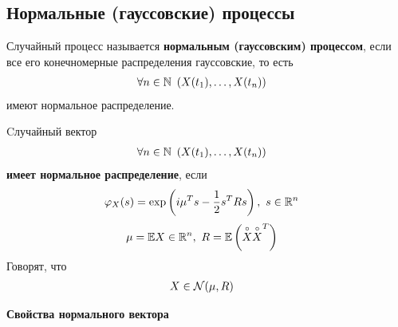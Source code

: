 \subsection{Нормальные (гауссовские) процессы}
\begin{Def}
    Случайный процесс называется \textbf{нормальным (гауссовским) процессом}, если все его конечномерные распределения гауссовские, то есть
    \begin{align*}
      & \forall n \in \mathbb{N} \ \left(X(t_1), \dots, X(t_n)\right)
    \end{align*}
    имеют нормальное распределение.
\end{Def}
\begin{Def}
    Cлучайный вектор
    \begin{align*}
      & \forall n \in \mathbb{N} \ \left(X(t_1), \dots, X(t_n)\right)
    \end{align*}
    \textbf{имеет нормальное распределение}, если
    \begin{align*}
      & \varphi_X(s) = \exp\left(i\mu^T s - \frac{1}{2}s^TRs\right), \ s \in \mathbb{R}^n
    \end{align*}
    \begin{align*}
      & \mu = \mathbb{E} X \in \mathbb{R}^n, \ R = \mathbb{E}\left( \overset{\circ}{X}\overset{\circ}{X}^T \right)
    \end{align*}
    Говорят, что
    \begin{align*}
      & X \in \mathcal{N}(\mu, R)
    \end{align*}  
\end{Def}
\textbf{Свойства нормального вектора}
